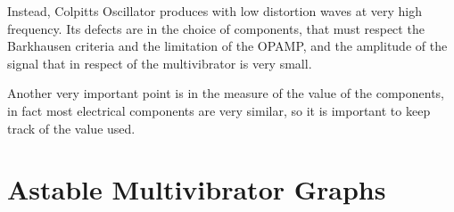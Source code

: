 \documentclass[a4paper, twocolumn]{article}
\begin{document}
Instead, Colpitts Oscillator produces with low distortion waves at very high frequency. Its defects are in the choice of components, that must respect the Barkhausen criteria and the limitation of the OPAMP, and the amplitude of the signal that in respect of the multivibrator is very small.

Another very important point is in the measure of the value of the components, in fact most electrical components are very similar, so it is important to keep track of the value used. 

\appendix
\onecolumn

\section{Astable Multivibrator Graphs}
\label{app:multivib}
\end{document}
